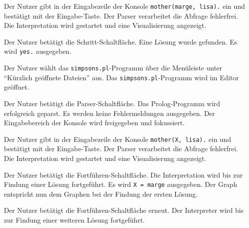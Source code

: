 \documentclass[parskip=full,11pt,twoside]{scrartcl}
\begin{document}
{Der Nutzer gibt in der Eingabezeile der Konsole \texttt{mother(marge, lisa).} ein und bestätigt mit der Eingabe-Taste.}
{Der Parser verarbeitet die Abfrage fehlerfrei. Die Interpretation wird gestartet und eine Visualisierung angezeigt.}

{Der Nutzer betätigt die Schritt-Schaltfläche.}
{Eine Lösung wurde gefunden. Es wird \texttt{yes.} ausgegeben.}



{Der Nutzer wählt das \texttt{simpsons.pl}-Programm über die Menüleiste unter \enquote{Kürzlich geöffnete Dateien} aus.}
{Das \texttt{simpsons.pl}-Programm wird im Editor geöffnet.}

{Der Nutzer betätigt die Parser-Schaltfläche.}
{Das Prolog-Programm wird erfolgreich geparst. Es werden keine Fehlermeldungen ausgegeben. Der Eingabebereich der Konsole wird freigegeben und fokussiert.}

{Der Nutzer gibt in der Eingabezeile der Konsole \texttt{mother(X, lisa).} ein und bestätigt mit der Eingabe-Taste.}
{Der Parser verarbeitet die Abfrage fehlerfrei. Die Interpretation wird gestartet und eine Visualisierung angezeigt.}

{Der Nutzer betätigt die Fortführen-Schaltfläche.}
{Die Interpretation wird bis zur Findung einer Lösung fortgeführt. Es wird \texttt{X = marge} ausgegeben. Der Graph entspricht nun dem Graphen bei der Findung der ersten Lösung.}

{Der Nutzer betätigt die Fortführen-Schaltfläche erneut.}
{Der Interpreter wird bis zur Findung einer weiteren Lösung fortgeführt.}
\end{document}
